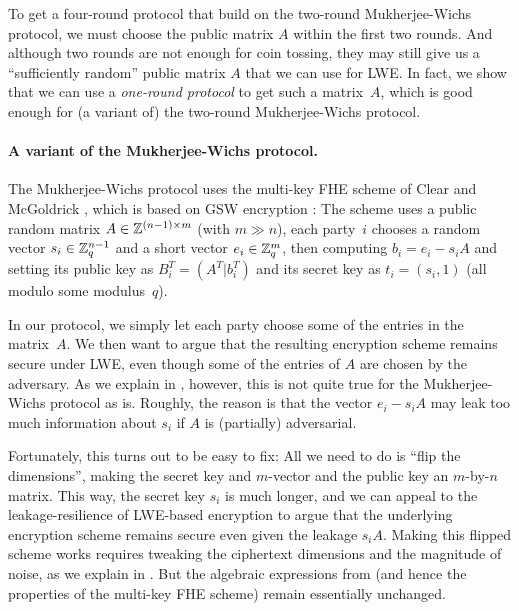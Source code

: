To get a four-round protocol that build on the two-round Mukherjee-Wichs protocol, we must choose the public matrix $A$ within the first two rounds. And although two rounds are not enough for coin tossing, they may still give us a ``sufficiently random'' public matrix $A$ that we can use for LWE. In fact, we show that we can use a \emph{one-round protocol} to get such a matrix~$A$, which is good enough for (a variant of) the two-round Mukherjee-Wichs protocol.

\paragraph{A variant of the Mukherjee-Wichs protocol.}
The Mukherjee-Wichs protocol uses the multi-key FHE scheme of Clear and McGoldrick \cite{C:CleMcg15,MW16}, which is based on GSW encryption \cite{C:GenSahWat13}: The scheme uses a public random matrix $A\in\mathbb{Z}^{(n-1)\times m}$ (with $m\gg n$), each party~$i$ chooses a random vector $s_i\in \mathbb{Z}_q^{n-1}$ and a short vector $e_i\in \mathbb{Z}_q^{m}$, then computing $b_i=e_i-s_iA$ and setting its public key as $B_i^T = (A^T|b_i^T)$ and its secret key as $t_i=(s_i,1)$ (all modulo some modulus~$q$).

In our protocol, we simply let each party choose some of the entries in the matrix~$A$. We then want to argue that the resulting encryption scheme remains secure under LWE, even though some of the entries of $A$ are chosen by the adversary. As we explain in , however, this is not quite true for the Mukherjee-Wichs protocol as is. Roughly, the reason is that the vector $e_i-s_iA$ may leak too much information about $s_i$ if $A$ is (partially) adversarial.

Fortunately, this turns out to be easy to fix: All we need to do is ``flip the dimensions'', making the secret key and $m$-vector and the public key an $m$-by-$n$ matrix. This way, the secret key $s_i$ is much longer, and we can appeal to the leakage-resilience of LWE-based encryption to argue that the underlying encryption scheme remains secure even given the leakage $s_iA$. Making this flipped scheme works requires tweaking the ciphertext dimensions and the magnitude of noise, as we explain in . But the algebraic expressions from \cite{C:CleMcg15,MW16} (and hence the properties of the multi-key FHE scheme) remain essentially unchanged.

